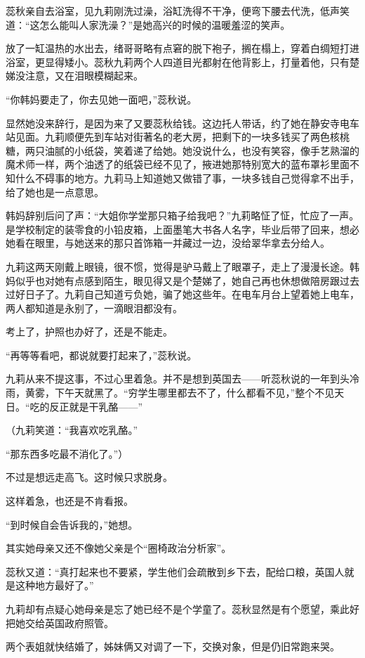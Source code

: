 \par 蕊秋亲自去浴室，见九莉刚洗过澡，浴缸洗得不干净，便弯下腰去代洗，低声笑道：“这怎么能叫人家洗澡？”是她高兴的时候的温暖羞涩的笑声。
\par 放了一缸温热的水出去，绪哥哥略有点窘的脱下袍子，搁在榻上，穿着白绸短打进浴室，更显得矮小。蕊秋九莉两个人四道目光都射在他背影上，打量着他，只有楚娣没注意，又在泪眼模糊起来。
\par “你韩妈要走了，你去见她一面吧，”蕊秋说。
\par 显然她没来辞行，是因为来了又要蕊秋给钱。这边托人带话，约了她在静安寺电车站见面。九莉顺便先到车站对街著名的老大房，把剩下的一块多钱买了两色核桃糖，两只油腻的小纸袋，笑着递了给她。她没说什么，也没有笑容，像手艺熟溜的魔术师一样，两个油透了的纸袋已经不见了，掖进她那特别宽大的蓝布罩衫里面不知什么不碍事的地方。九莉马上知道她又做错了事，一块多钱自己觉得拿不出手，给了她也是一点意思。
\par 韩妈辞别后问了声：“大姐你学堂那只箱子给我吧？”九莉略怔了怔，忙应了一声。是学校制定的装零食的小铅皮箱，上面墨笔大书各人名字，毕业后带了回来，想必她看在眼里，与她送来的那只首饰箱一并藏过一边，没给翠华拿去分给人。
\par 九莉这两天刚戴上眼镜，很不惯，觉得是驴马戴上了眼罩子，走上了漫漫长途。韩妈似乎也对她有点感到陌生，眼见得又是个楚娣了，她自己再也休想做陪房跟过去过好日子了。九莉自己知道亏负她，骗了她这些年。在电车月台上望着她上电车，两人都知道是永别了，一滴眼泪都没有。
\par 考上了，护照也办好了，还是不能走。
\par “再等等看吧，都说就要打起来了，”蕊秋说。
\par 九莉从来不提这事，不过心里着急。并不是想到英国去——听蕊秋说的一年到头冷雨，黄雾，下午天就黑了。“穷学生哪里都去不了，什么都看不见，”整个不见天日。“吃的反正就是干乳酪——”
\par （九莉笑道：“我喜欢吃乳酪。”
\par “那东西多吃最不消化了。”）
\par 不过是想远走高飞。这时候只求脱身。
\par 这样着急，也还是不肯看报。
\par “到时候自会告诉我的，”她想。
\par 其实她母亲又还不像她父亲是个“圈椅政治分析家”。
\par 蕊秋又道：“真打起来也不要紧，学生他们会疏散到乡下去，配给口粮，英国人就是这种地方最好了。”
\par 九莉却有点疑心她母亲是忘了她已经不是个学童了。蕊秋显然是有个愿望，乘此好把她交给英国政府照管。
\par 两个表姐就快结婚了，姊妹俩又对调了一下，交换对象，但是仍旧常跑来哭。
